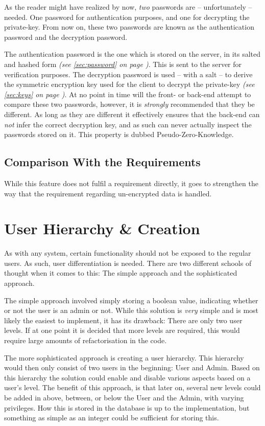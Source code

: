 		As the reader might have realized by now, \emph{two} passwords are -- unfortunately -- needed. One password for authentication purposes, and one for decrypting the private-key. From now on, these two passwords are known as the authentication password and the decryption password.
 
		The authentication password is the one which is stored on the server, in its salted and hashed form \emph{(see \ref{sec:password} on page \pageref{sec:password})}. This is sent to the server for verification purposes. The decryption password is used -- with a salt -- to derive the symmetric encryption key used for the client to decrypt the private-key \emph{(see \ref{sec:keys} on page \pageref{sec:keys})}. At no point in time will the front- or back-end attempt to compare these two passwords, however, it is \emph{strongly} recommended that they be different. As long as they are different it effectively ensures that the back-end can \emph{not} infer the correct decryption key, and as such can never actually inspect the passwords stored on it. This property is dubbed Pseudo-Zero-Knowledge.

		\subsection{Comparison With the Requirements}
			While this feature does not fulfil a requirement directly, it goes to strengthen the way that the requirement regarding un-encrypted data is handled.

	\section{User Hierarchy \& Creation}
		\label{sec:user:diff}
		As with any system, certain functionality should not be exposed to the regular users. As such, user differentiation is needed. There are two different schools of thought when it comes to this: The simple approach and the sophisticated approach.

		The simple approach involved simply storing a boolean value, indicating whether or not the user is an admin or not. While this solution is \emph{very} simple and is most likely the easiest to implement, it has its drawback: There are only two user levels. If at one point it is decided that more levels are required, this would require large amounts of refactorisation in the code.

		The more sophisticated approach is creating a user hierarchy. This hierarchy would then only consist of two users in the beginning: User and Admin. Based on this hierarchy the solution could enable and disable various aspects based on a user's level. The benefit of this approach, is that later on, several new levels could be added in above, between, or below the User and the Admin, with varying privileges. How this is stored in the database is up to the implementation, but something as simple as an integer could be sufficient for storing this.

